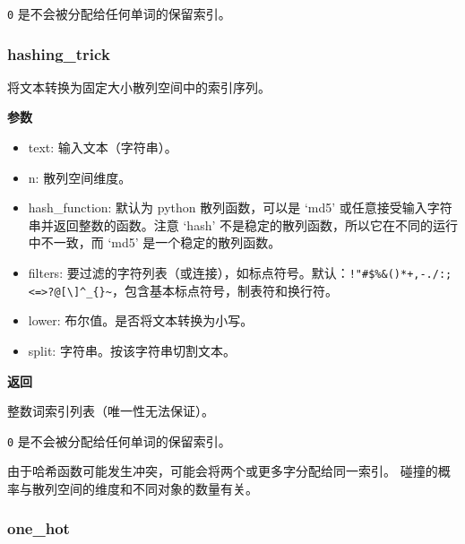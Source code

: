 \texttt{0} 是不会被分配给任何单词的保留索引。

\hypertarget{hashing_trick}{%
\subsubsection{hashing\_trick}\label{hashing_trick}}

\begin{Shaded}
\end{Shaded}

将文本转换为固定大小散列空间中的索引序列。

\textbf{参数}

\begin{itemize}
\tightlist
\item
  text: 输入文本（字符串）。
\item
  n: 散列空间维度。
\item
  hash\_function: 默认为 python 散列函数，可以是 `md5'
  或任意接受输入字符串并返回整数的函数。注意 `hash'
  不是稳定的散列函数，所以它在不同的运行中不一致，而 `md5'
  是一个稳定的散列函数。
\item
  filters:
  要过滤的字符列表（或连接），如标点符号。默认：\texttt{!"\#\$\%\&()*+,-./:;\textless{}=\textgreater{}?@{[}\textbackslash{}{]}\^{}\_\{\textbar{}\}\textasciitilde{}}，包含基本标点符号，制表符和换行符。
\item
  lower: 布尔值。是否将文本转换为小写。
\item
  split: 字符串。按该字符串切割文本。
\end{itemize}

\textbf{返回}

整数词索引列表（唯一性无法保证）。

\texttt{0} 是不会被分配给任何单词的保留索引。

由于哈希函数可能发生冲突，可能会将两个或更多字分配给同一索引。
碰撞的概率与散列空间的维度和不同对象的数量有关。

\hypertarget{one_hot}{%
\subsubsection{one\_hot}\label{one_hot}}

